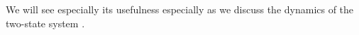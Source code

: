 We will see especially its usefulness especially as we discuss the dynamics of the two-state system .